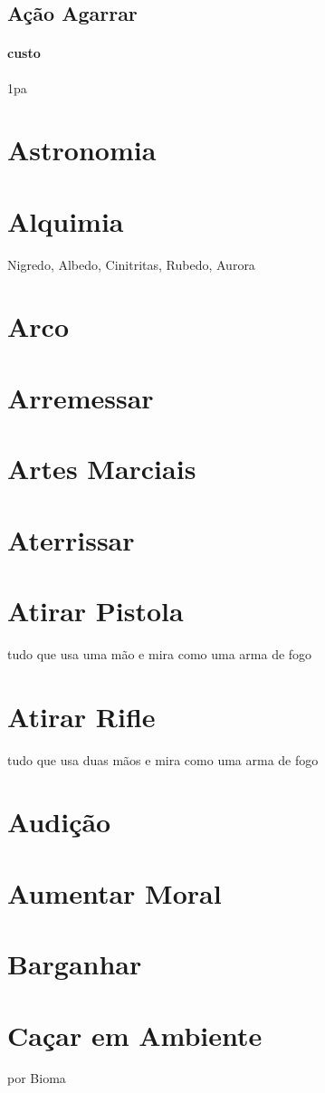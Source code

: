 \subsection{Ação Agarrar}
\paragraph{custo} 1pa 

\section{Astronomia}
\section{Alquimia} Nigredo, Albedo, Cinitritas, Rubedo, Aurora
\section{Arco}
\section{Arremessar}
\section{Artes Marciais}
\section{Aterrissar}
\section{Atirar Pistola} tudo que usa uma mão e mira como uma arma de fogo%
\section{Atirar Rifle} tudo que usa duas mãos e mira como uma arma de fogo%
\section{Audição}
\section{Aumentar Moral}
\section{Barganhar}
\section{Caçar em Ambiente} por Bioma
